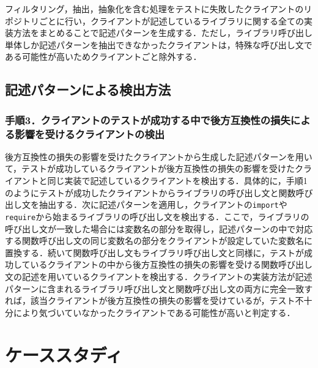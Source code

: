 \documentclass[11pt]{jreport}
\begin{document}
フィルタリング，抽出，抽象化を含む処理をテストに失敗したクライアントのリポジトリごとに行い，クライアントが記述しているライブラリに関する全ての実装方法をまとめることで記述パターンを生成する．ただし，ライブラリ呼び出し単体しか記述パターンを抽出できなかったクライアントは，特殊な呼び出し文である可能性が高いためクライアントごと除外する．
\section{記述パターンによる検出方法}

\subsection{手順3．クライアントのテストが成功する中で後方互換性の損失による影響を受けるクライアントの検出}

後方互換性の損失の影響を受けたクライアントから生成した記述パターンを用いて，テストが成功しているクライアントが後方互換性の損失の影響を受けたクライアントと同じ実装で記述しているクライアントを検出する．具体的に，手順1のようにテストが成功したクライアントからライブラリの呼び出し文と関数呼び出し文を抽出する．次に記述パターンを適用し，クライアントの\texttt{import}や\texttt{require}から始まるライブラリの呼び出し文を検出する．ここで，ライブラリの呼び出し文が一致した場合には変数名の部分を取得し，記述パターンの中で対応する関数呼び出し文の同じ変数名の部分をクライアントが設定していた変数名に置換する．続いて関数呼び出し文もライブラリ呼び出し文と同様に，テストが成功しているクライアントの中から後方互換性の損失の影響を受ける関数呼び出し文の記述を用いているクライアントを検出する．クライアントの実装方法が記述パターンに含まれるライブラリ呼び出し文と関数呼び出し文の両方に完全一致すれば，該当クライアントが後方互換性の損失の影響を受けているが，テスト不十分により気づいていなかったクライアントである可能性が高いと判定する．


\chapter{ケーススタディ}\label{chap:case_study}
\end{document}
